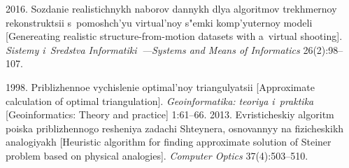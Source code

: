   \begin{multicols}{2}

\renewcommand{\bibname}{\protect\rmfamily References}

{\small\frenchspacing
 {%
 \begin{thebibliography}{99}
 2016. Sozdanie rea\-li\-stich\-nykh 
naborov dannykh dlya al\-go\-rit\-mov trekh\-mer\-noy rekonstruktsii s~pomoshch'yu 
virtual'noy s"em\-ki komp'yuternoy modeli [Genereating realistic  
structure-from-motion datasets with a~virtual shooting]. \textit{Sistemy i~Sredstva 
Informatiki~---Systems and Means of Informatics} 26(2):98--107.

 1998. Priblizhennoe vychislenie 
optimal'noy triangulyatsii [Approximate calculation of optimal triangulation]. 
\textit{Geoinformatika: teoriya i~praktika} [Geoinformatics: Theory and practice] 
 1:61--66.
 2013. Evristicheskiy algoritm poiska 
priblizhennogo resheniya zadachi Shteynera, osnovannyy na fizicheskikh 
analogiyakh [Heuristic algorithm for finding approximate solution of Steiner 
problem based on physical analogies]. \textit{Computer 
Optics} 37(4):503--510.


\end{thebibliography}}}
\end{multicols}
